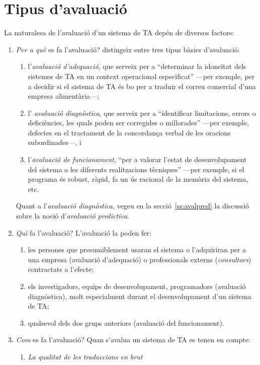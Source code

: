 \section{Tipus d'avaluació}
La naturalesa de l'avaluació d'un sistema de TA
depén de diversos factors:
\begin{enumerate}
\item \emph{Per a què} es fa l'avaluació? \citet{hutchins96u} distingeix
  entre tres tipus bàsics d'avaluació: 
\begin{enumerate}
\item l'\emph{avaluació
  d'adequació}, que serveix per a ``determinar la idoneïtat
dels sistemes de TA en un context operacional especificat'' ---per
exemple, per a decidir si el sistema de TA és bo per a traduir el correu
comercial d'una empresa alimentària---;
\item l'{\em
  avaluació diagnòstica}, que serveix per a ``identificar
limitacions, errors o deficiències, les quals poden ser corregides
o millorades'' ---per exemple, defectes en el tractament de la
concordança verbal de les oracions subordinades---, i
\item l'\emph{avaluació de funcionament},  ``per a valorar l'estat de
  desenvolupament del sistema o les diferents realitzacions
  tècniques'' ---per exemple, si el programa és robust,
  ràpid, fa un ús racional de la memòria del sistema, etc.
\end{enumerate}
Quant a l'\emph{avaluació diagnòstica}, vegeu en la
secció~\ref{ss:avalpred} la discussió sobre la noció
d'\emph{avaluació predictiva}.
\item \emph{Qui} fa l'avaluació? L'avaluació la poden fer:
  \begin{enumerate} 
  \item les
  persones que presumiblement usaran el sistema o l'adquiriran per a
  una empresa   (avaluació d'adequació) o professionals externs
  (\emph{consultors}) contractats a l'efecte;
  \item els investigadors, equips de desenvolupament, programadors
    (avaluació diagnòstica), molt especialment durant el
    desenvolupament d'un sistema de TA;
  \item qualsevol dels dos grups anteriors (avaluació del funcionament).
  \end{enumerate}
\item \emph{Com} es fa l'avaluació? Quan s'avalua un sistema de
  TA es tenen en compte:
\begin{enumerate}
\item \emph{La qualitat de les traduccions en brut}

\end{enumerate}
\end{enumerate}
